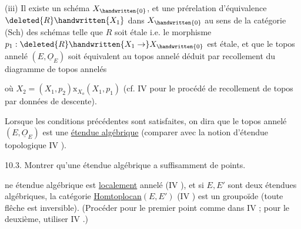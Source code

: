 (iii) Il existe un schéma $X_{\handwritten{0}}$, et une prérelation d'équivalence $\deleted{R}\handwritten{X_1}$ dans $X_{\handwritten{0}}$ au sens de la catégorie (Sch) des schémas \handwritten{,}\unsure{,} telle que $R$ soit étale i.e. le morphisme $p_1:\deleted{R}\handwritten{X_1\to}X_{\handwritten{0}}$ est étale, et que le topos annelé $(E,\underline{O}_E)$ soit équivalent au topos annelé déduit par recollement du diagramme  de topos annelés  

\margin{\handwritten{$\times$}}
où $X_2=(X_1,p_2)\mathbin{\mathrm{x}}_{X_o}(X_1,p_1)$ (cf. IV  pour le procédé de recollement de topos par données de descente).

Lorsque les conditions précédentes sont satisfaites, on dira que le topos annelé $(E,\underline{O}_E)$ est une \uline{étendue algébrique} (comparer avec la notion d'étendue topologique IV ).
\margin{\handwritten{$\times$}}

10.3. Montrer qu'une étendue algébrique a suffisamment de points.

\margin{\handwritten{$\times$}}
ne étendue algébrique est \uline{localement} annelé (IV ), et si $E,E'$ sont deux étendues algébriques, la catégorie \uline{Homtoplocan}$(E,E')$ (IV ) est un groupoïde (toute flêche est inversible). (Procéder pour le premier point comme dans IV ; pour le deuxième, utiliser IV \hspace{2em}.)
\margin{\handwritten{$\times\quad\times$}}

